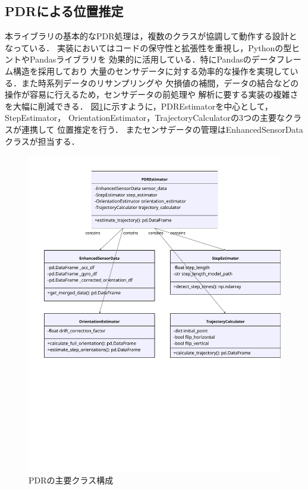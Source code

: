 
\subsection{PDRによる位置推定}

本ライブラリの基本的なPDR処理は，複数のクラスが協調して動作する設計となっている．
実装においてはコードの保守性と拡張性を重視し，Pythonの型ヒントやPandasライブラリを
効果的に活用している．特にPandasのデータフレーム構造を採用しており
大量のセンサデータに対する効率的な操作を実現している．また時系列データのリサンプリングや
欠損値の補間，データの結合などの操作が容易に行えるため，センサデータの前処理や
解析に要する実装の複雑さを大幅に削減できる．
図\ref{fig:pdr-class}に示すように，PDREstimatorを中心として，StepEstimator，
OrientationEstimator，TrajectoryCalculatorの3つの主要なクラスが連携して
位置推定を行う．
またセンサデータの管理はEnhancedSensorDataクラスが担当する．

\begin{figure}[H]
    \centering
    \includegraphics[width=\linewidth]{../image/pdr_figure.pdf}
    \caption{PDRの主要クラス構成}
    \label{fig:pdr-class}
\end{figure}

